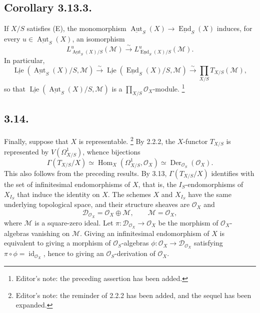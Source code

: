 \subsection*{Corollary 3.13.3.}
If \(X/S\) satisfies (E), the monomorphism
\(\underline{\operatorname{Aut}}_S(X)\to
\underline{\operatorname{End}}_S(X)\) induces, for every
\(u\in\underline{\operatorname{Aut}}_S(X)\), an isomorphism
\[
  L^u_{\underline{\operatorname{Aut}}_S(X)/S}(\mathcal M)
  \xrightarrow{\sim}
  L^u_{\underline{\operatorname{End}}_S(X)/S}(\mathcal M).
\]
In particular,
\[
  \underline{\operatorname{Lie}}
    (\underline{\operatorname{Aut}}_S(X)/S,\mathcal M)
  \xrightarrow{\sim}
  \underline{\operatorname{Lie}}
    (\underline{\operatorname{End}}_S(X)/S,\mathcal M)
  \xrightarrow{\sim}
  \prod_{X/S}T_{X/S}(\mathcal M),
\]
so that
\(\underline{\operatorname{Lie}}
  (\underline{\operatorname{Aut}}_S(X)/S,\mathcal M)\)
is a \(\prod_{X/S}\mathcal O_X\)-module.
\footnote{Editor's note: the preceding assertion has been added.}

\subsection*{3.14.}
Finally, suppose that \(X\) is representable.
\footnote{Editor's note: the reminder of 2.2.2 has been added, and the
sequel has been expanded.}
By 2.2.2, the \(X\)-functor \(T_{X/S}\) is represented by
\(V(\Omega^1_{X/S})\), whence bijections
\[
  \Gamma(T_{X/S}/X)
  \simeq\operatorname{Hom}_X(\Omega^1_{X/S},\mathcal O_X)
  \simeq\operatorname{Der}_{\mathcal O_S}(\mathcal O_X).
\]
This also follows from the preceding results. By 3.13,
\(\Gamma(T_{X/S}/X)\) identifies with the set of infinitesimal
endomorphisms of \(X\), that is, the \(I_S\)-endomorphisms of
\(X_{I_S}\) that induce the identity on \(X\). The schemes \(X\) and
\(X_{I_S}\) have the same underlying topological space, and their
structure sheaves are \(\mathcal O_X\) and
\[
  \mathscr D_{\mathcal O_X}=\mathcal O_X\oplus\mathcal M,
  \qquad \mathcal M=\mathcal O_X,
\]
where \(\mathcal M\) is a square-zero ideal. Let
\(\pi:\mathscr D_{\mathcal O_X}\to\mathcal O_X\) be the morphism of
\(\mathcal O_X\)-algebras vanishing on \(\mathcal M\). Giving an
infinitesimal endomorphism of \(X\) is equivalent to giving a morphism of
\(\mathcal O_S\)-algebras
\(\phi:\mathcal O_X\to\mathscr D_{\mathcal O_X}\) satisfying
\(\pi\circ\phi=\operatorname{id}_{\mathcal O_X}\), hence to giving an
\(\mathcal O_S\)-derivation of \(\mathcal O_X\).

